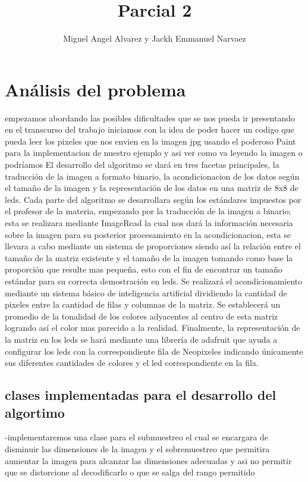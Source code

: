\documentclass{article}
\title{Parcial 2}
\author{Miguel Angel Alvarez y Jackh Emmanuel Narvaez}
\begin{document}
\maketitle



\section{Análisis del problema}

empezamos abordando las posibles dificultades que se nos pueda ir presentando en el transcurso del trabajo iniciamos con la idea de poder hacer un codigo que pueda leer los pixeles que nos envien en la imagen jpg usando el poderoso Paint para la implementacion de nuestro ejemplo y asi ver como va leyendo la imagen o podríamos El desarrollo del algoritmo se dará en tres facetas principales, la traducción de la imagen a formato binario, la acondicionacion de los datos según el tamaño de la imagen y la representación de los datos en una matriz de 8x8 de leds. Cada parte del algoritmo se desarrollara según los estándares impuestos por el profesor de la materia, empezando por la traducción de la imagen a binario; esta se realizara mediante ImageRead la cual nos dará la información necesaria sobre la imagen para su posterior procesamiento en la acondicionacion, esta se llevara a cabo mediante un sistema de proporciones siendo así la relación entre el tamaño de la matriz existente y el tamaño de la imagen tomando como base la proporción que resulte mas pequeña, esto con el fin de encontrar un tamaño estándar para su correcta demostración en leds. Se realizará el acondicionamiento mediante un sistema básico de inteligencia artificial dividiendo la cantidad de pixeles entre la cantidad de filas y columnas de la matriz. Se establecerá un promedio de la tonalidad de los colores adyacentes al centro de esta matriz logrando así el color mas parecido a la realidad. Finalmente, la representación de la matriz en los leds se hará mediante una librería de adafruit que ayuda a configurar los leds con la correspondiente fila de Neopixeles indicando únicamente sus diferentes cantidades de colores y el led correspondiente en la fila. 
\subsection{clases implementadas para el desarrollo del algortimo}
-implementaremos una clase para el submuestreo el cual se encargara de disminuir las dimensiones de la imagen y el sobremuestreo que permitira aumentar la imagen para alcanzar las dimensiones adecuadas y asi no permitir que se distorcione al decodificarlo o que se salga del rango permitido 
\end{document}
